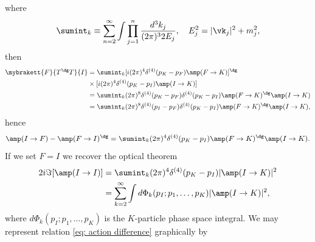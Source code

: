 where
\begin{equation}
    \sumint_k \equiv \sum_{n=2}^\infty\int\prod_{j=1}^n\frac{d^3k_j}{(2\pi)^32E_j},\quad E_j^2 = |\vk_j|^2 + m_j^2,
\end{equation}
then
\begin{equation}
    \begin{split}
        \mybrakett{F}{T^\dg T}{I} &= \sumint_k[i(2\pi)^4\delta^{(4)}(p_K - p_F)\amp(F \to K)]^\dg \\
        &\times[i(2\pi)^4\delta^{(4)}(p_K - p_I)\amp(I \to K)] \\
        &= \sumint_k(2\pi)^8\delta^{(4)}(p_K - p_F)\delta^{(4)}(p_K - p_I)\amp(F \to K)^\dg\amp(I \to K) \\
        &= \sumint_k(2\pi)^8\delta^{(4)}(p_I - p_F)\delta^{(4)}(p_K - p_I)\amp(F \to K)^\dg\amp(I \to K),
    \end{split}
\end{equation}
hence
\begin{equation}
\label{eq: action difference}
    \amp(I \to F) - \amp(F \to I)^\dg = \sumint_k(2\pi)^4\delta^{(4)}(p_K - p_I)\amp(F \to K)^\dg\amp(I \to K).
\end{equation}
If we set $F = I$ we recover the optical theorem
\begin{equation}
    \begin{split}
        2i\Im{[\amp(I \to I)]} &= \sumint_k(2\pi)^4\delta^{(4)}(p_K - p_I)|\amp(I \to K)|^2 \\
        &= \sum_{k=2}^\infty\int d\Phi_k(p_I;p_1,\dots,p_K)|\amp(I \to K)|^2,
    \end{split}
\end{equation}
where $d\Phi_k(p_I;p_1,\dots,p_K)$ is the $K$-particle phase space integral. We may represent relation \eqref{eq: action difference} graphically by 
